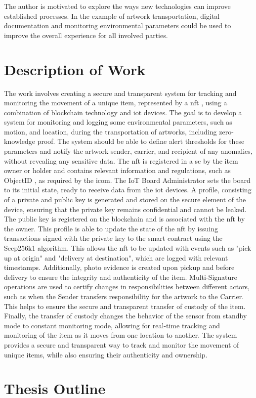 The author is motivated to explore the ways new technologies can improve established processes. In the example of artwork transportation, digital documentation and monitoring environmental parameters could be used to improve the overall experience for all involved parties. 

\section{Description of Work}
The work involves creating a secure and transparent system for tracking and monitoring the movement of a unique item, represented by a \gls{nft} \cite{nftminter}, using a combination of blockchain technology and \gls{iot} devices. The goal is to develop a system for monitoring and logging some environmental parameters, such as motion, and location, during the transportation of artworks, including zero-knowledge proof. The system should be able to define alert thresholds for these parameters and notify the artwork sender, carrier, and recipient of any anomalies, without revealing any sensitive data. The \gls{nft} is registered in a \gls{sc} by the item owner or holder and contains relevant information and regulations, such as ObjectID \cite{objectid}, as required by the \gls{icom}. The IoT Board Administrator sets the board to its initial state, ready to receive data from the \gls{iot} devices. A profile, consisting of a private and public key is generated and stored on the secure element of the device, ensuring that the private key remains confidential and cannot be leaked. The public key is registered on the blockchain and is associated with the \gls{nft} by the owner. This profile is able to update the state of the \gls{nft} by issuing transactions signed with the private key to the smart contract using the Secp256k1 algorithm. This allows the \gls{nft} to be updated with events such as "pick up at origin" and "delivery at destination", which are logged with relevant timestamps. Additionally, photo evidence is created upon pickup and before delivery to ensure the integrity and authenticity of the item. Multi-Signature operations are used to certify changes in responsibilities between different actors, such as when the Sender transfers responsibility for the artwork to the Carrier. This helps to ensure the secure and transparent transfer of custody of the item. Finally, the transfer of custody changes the behavior of the sensor from standby mode to constant monitoring mode, allowing for real-time tracking and monitoring of the item as it moves from one location to another. The system provides a secure and transparent way to track and monitor the movement of unique items, while also ensuring their authenticity and ownership.

\section{Thesis Outline}

